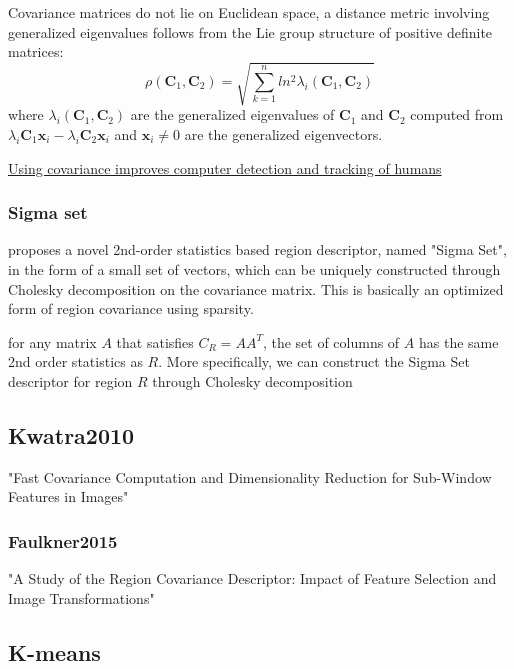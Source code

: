 Covariance matrices do not lie on Euclidean space, a distance metric involving generalized eigenvalues follows from the Lie group structure of positive definite matrices:
\begin{equation}
 \rho(\mathbf{C}_1, \mathbf{C}_2) = \sqrt{\sum\limits^n_{k=1} ln^2 \lambda_i(\mathbf{C}_1, \mathbf{C}_2)}
\end{equation}
where $\lambda_i(\mathbf{C}_1, \mathbf{C}_2)$ are the generalized eigenvalues
of $\mathbf{C}_1$ and $\mathbf{C}_2$ computed from 
$\lambda_i\mathbf{C}_1\mathbf{x}_i - \lambda_i\mathbf{C}_2\mathbf{x}_i$
and $\mathbf{x}_i \ne 0$ are the generalized eigenvectors.

\href{https://spie.org/news/0368-using-covariance-improves-computer-detection-and-tracking-of-humans?SSO=1}{Using covariance improves computer detection and tracking of humans}


\subsubsection{Sigma set}\label{sigmaset}
\cite{Chang2009} proposes a novel 2nd-order statistics based region descriptor, named "Sigma Set", in the form of a small set of vectors, which can be uniquely constructed through Cholesky decomposition on the covariance matrix.
This is basically an optimized form of region covariance using sparsity.

for any matrix $A$ that satisfies $C_R=AA^T$, the set of columns of $A$ has the same 2nd order statistics as $R$. More specifically, we can construct the Sigma Set descriptor for region $R$ through Cholesky decomposition

\subsection{Kwatra2010}
"Fast Covariance Computation and
Dimensionality Reduction for Sub-Window Features in Images"

\subsubsection{Faulkner2015}
\cite{Faulkner2015} "A Study of the Region Covariance Descriptor: Impact of Feature Selection and Image Transformations"

\subsection{K-means}

